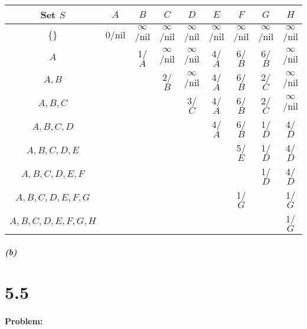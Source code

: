 \documentclass[12pt]{article}
\begin{document}
\begin{center}
\begin{tabular}{ | c | c | c | c | c | c | c | c | c |}
\hline
Set $S$ & $A$ & $B$ & $C$ & $D$ & $E$ & $F$ & $G$ & $H$ \\ \hline
\{\} & 0/nil & $\infty$/nil & $\infty$/nil & $\infty$/nil & $\infty$/nil
& $\infty$/nil & $\infty$/nil & $\infty$/nil \\ \hline
$A$ & & 1/$A$ & $\infty$/nil & $\infty$/nil & 4/$A$ & 6/$B$ & 6/$B$ & $\infty$/nil \\ \hline
$A,B$ & & & 2/$B$ & $\infty$/nil & 4/$A$ & 6/$B$ & 2/$C$ & $\infty$/nil \\ \hline
$A,B,C$ & & & & 3/$C$ & 4/$A$ & 6/$B$ & 2/$C$ & $\infty$/nil \\ \hline
$A,B,C,D$ & & & & & 4/$A$ & 6/$B$ & 1/$D$ & 4/$D$ \\ \hline
$A,B,C,D,E$ & & & & & & 5/$E$ & 1/$D$ & 4/$D$ \\ \hline
$A,B,C,D,E,F$ & & & & & & & 1/$D$ & 4/$D$ \\ \hline
$A,B,C,D,E,F,G$ & & & & & & 1/$G$ & & 1/$G$ \\ \hline
$A,B,C,D,E,F,G,H$ & & & & & & & & 1/$G$ \\ \hline
\end{tabular}
\end{center} 

%

\subparagraph{(b)}

\section*{5.5}
\paragraph{Problem:}
\end{document}
